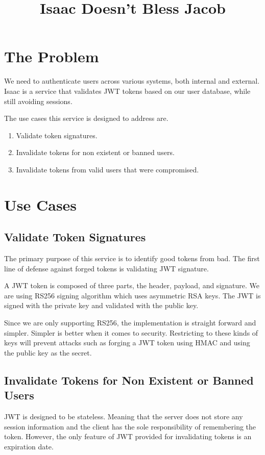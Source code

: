 \documentclass[11pt]{article}
\title{Isaac Doesn't Bless Jacob}
\begin{document}
\maketitle
\section{The Problem}

We need to authenticate users across various systems, both internal and external.
Isaac is a service that validates JWT tokens based on our user database, while
still avoiding sessions.

The use cases this service is designed to address are.
\begin{enumerate}
    \item Validate token signatures.
    \item Invalidate tokens for non existent or banned users.
    \item Invalidate tokens from valid users that were compromised. 
\end{enumerate}

\section{Use Cases}
\subsection{Validate Token Signatures}

The primary purpose of this service is to identify good tokens from bad. The first
line of defense against forged tokens is validating JWT signature.

A JWT token is composed of three parts, the header, payload, and signature.
We are using RS256 signing algorithm which uses asymmetric RSA keys. The JWT
is signed with the private key and validated with the public key.

Since we are only supporting RS256, the implementation is straight forward and
simpler. Simpler is better when it comes to security. Restricting to these kinds
of keys will prevent attacks such as forging a JWT token using HMAC and using
the public key as the secret.

\subsection{Invalidate Tokens for Non Existent or Banned Users}

JWT is designed to be stateless. Meaning that the server does not store any 
session information and the client has the sole responsibility of remembering the
token. However, the only feature of JWT provided for invalidating tokens is an expiration
date. 
\end{document}
